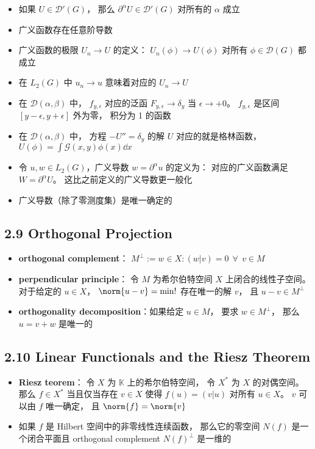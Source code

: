 \begin{itemize}
\item 如果 $U \in\mathcal D'(G)$， 那么 $\partial^\alpha U \in\mathcal D'(G)$ 对所有的 $\alpha$ 成立

\item 广义函数存在任意阶导数

\item 广义函数的极限 $U_n \to U$ 的定义： $U_n(\phi)\to U(\phi)$ 对所有 $\phi \in\mathcal D(G)$ 都成立

\item 在 $L_2(G)$ 中 $u_n\to u$ 意味着对应的 $U_n \to U$

\item 在 $\mathcal D(\alpha,\beta)$ 中， $f_{y,\epsilon}$ 对应的泛函 $F_{y, \epsilon}\to \delta_y$ 当 $\epsilon \to +0$。 $f_{y,\epsilon}$ 是区间 $[y-\epsilon,y+\epsilon]$ 外为零， 积分为 1 的函数

\item 在 $\mathcal D(\alpha,\beta)$ 中， 方程 $-U'' = \delta_y$ 的解 $U$ 对应的就是格林函数， $U(\phi) = \int \mathcal G(x, y) \phi(x) \dd{x}$

\item 令 $u, w \in L_2(G)$，广义导数 $w = \partial^\alpha u$ 的定义为： 对应的广义函数满足 $W = \partial^\alpha U$。 这比之前定义的广义导数更一般化

\item 广义导数（除了零测度集）是唯一确定的
\end{itemize}

\subsection{2.9 Orthogonal Projection}
\begin{itemize}
\item \textbf{orthogonal complement}： $M^\bot := {w \in X: (w|v) = 0\ \ \forall\ \ v\in M}$

\item \textbf{perpendicular principle}： 令 $M$ 为希尔伯特空间 $X$ 上闭合的线性子空间。 对于给定的 $u\in X$， $\norm{u - v} = \min!$ 存在唯一的解 $v$， 且 $u - v\in M^\bot$

\item \textbf{orthogonality decomposition}：如果给定 $u \in M$， 要求 $w \in M^\bot$， 那么 $u = v + w$ 是唯一的
\end{itemize}

\subsection{2.10 Linear Functionals and the Riesz Theorem}
\begin{itemize}
\item \textbf{Riesz teorem}： 令 $X$ 为 $\mathbb K$ 上的希尔伯特空间， 令 $X^*$ 为 $X$ 的对偶空间。 那么 $f\in X^*$ 当且仅当存在 $v\in X$ 使得 $f(u) = (v|u)$ 对所有 $u\in X$。 $v$ 可以由 $f$ 唯一确定， 且 $\norm{f} = \norm{v}$

\item 如果 $f$ 是 Hilbert 空间中的非零线性连续函数， 那么它的零空间 $N(f)$ 是一个闭合平面且 orthogonal complement $N(f)^\bot$ 是一维的
\end{itemize}

